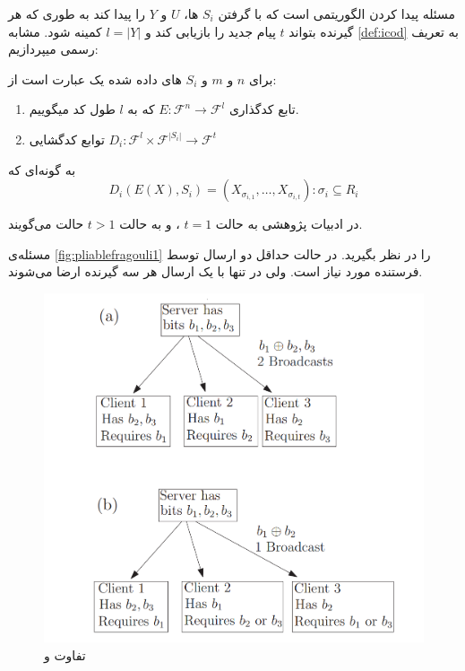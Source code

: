 	 مسئله 
	 \picodt
	 پیدا کردن الگوریتمی است که با گرفتن 
	 $S_i$
	 ها،
	 $U$
	 و
	 $Y$
	 را پیدا کند به طوری که هر گیرنده بتواند
	 $t$
	 پیام جدید را بازیابی کند و 
	 $l = |Y|$
	 کمینه شود. مشابه
	 \autoref{def:icod}
	 به تعریف رسمی
	 \picodt
	 میپردازیم:
\begin{definition}[\picodt]
	\label{def:picodt}
	برای
	$n$
	و
	$m$
	و
	$S_i$
	های داده شده یک
	\picodt
	عبارت است از:
	\begin{enumerate}
		\item 
		تابع کدگذاری
		$E: \mathcal{F}^n \rightarrow \mathcal{F}^l$
		که به 
		$l$
		طول کد میگوییم.
		\item 
		توابع کدگشایی 
		$D_i: \mathcal{F}^l \times \mathcal{F}^{|S_i|} \rightarrow \mathcal{F}^t$
	\end{enumerate}
	به گونه‌ای که
	$$D_i(E(X), S_i) = (X_{\sigma_{i,1}}, \ldots, X_{\sigma_{i,t}}): \sigma_i \subseteq R_i$$
\end{definition}

در ادبیات پژوهشی به حالت
$t = 1$
،
\picod
 و به حالت
$t > 1$
حالت
می‌گویند.

\begin{remark}
مسئله‌ی 
\autoref{fig:pliablefragouli1}
را در نظر بگیرید. در حالت 
\icod
 حداقل دو ارسال توسط فرستنده مورد نیاز است. ولی در
 \picod
 تنها با یک ارسال هر سه گیرنده ارضا می‌شوند.
 \begin{figure}[H]
 	\centering
 	\includegraphics[width=0.6\linewidth]{figs/ch3/pliable_fragouli1}
 	\caption[
 	تفاوت
 	\icod
 	و
 	\picod
 	]{
 		تفاوت
 		\icod
 		و
 		\picod
 		\cite{pliablefirstpaper}}
 	\label{fig:pliablefragouli1}
 \end{figure}
\end{remark}

